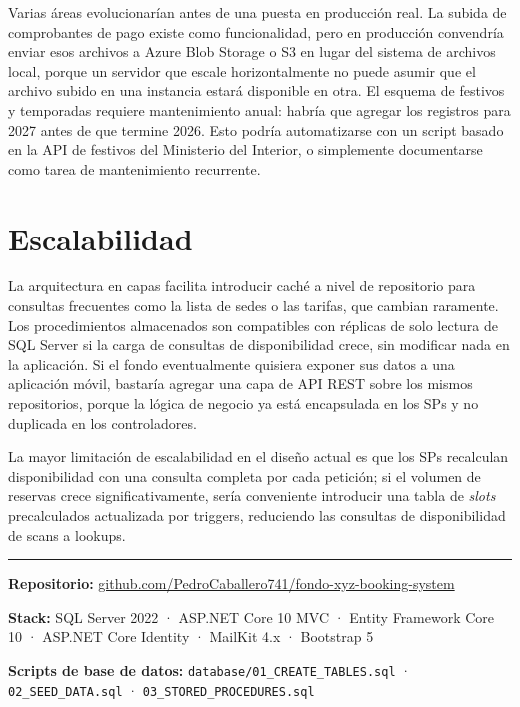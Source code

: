 \documentclass[12pt, letterpaper]{article}
\begin{document}
Varias áreas evolucionarían antes de una puesta en producción real. La subida de comprobantes de pago existe como funcionalidad, pero en producción convendría enviar esos archivos a Azure Blob Storage o S3 en lugar del sistema de archivos local, porque un servidor que escale horizontalmente no puede asumir que el archivo subido en una instancia estará disponible en otra. El esquema de festivos y temporadas requiere mantenimiento anual: habría que agregar los registros para 2027 antes de que termine 2026. Esto podría automatizarse con un script basado en la API de festivos del Ministerio del Interior, o simplemente documentarse como tarea de mantenimiento recurrente.

\section{Escalabilidad}

La arquitectura en capas facilita introducir caché a nivel de repositorio para consultas frecuentes como la lista de sedes o las tarifas, que cambian raramente. Los procedimientos almacenados son compatibles con réplicas de solo lectura de SQL Server si la carga de consultas de disponibilidad crece, sin modificar nada en la aplicación. Si el fondo eventualmente quisiera exponer sus datos a una aplicación móvil, bastaría agregar una capa de API REST sobre los mismos repositorios, porque la lógica de negocio ya está encapsulada en los SPs y no duplicada en los controladores.

La mayor limitación de escalabilidad en el diseño actual es que los SPs recalculan disponibilidad con una consulta completa por cada petición; si el volumen de reservas crece significativamente, sería conveniente introducir una tabla de \emph{slots} precalculados actualizada por triggers, reduciendo las consultas de disponibilidad de scans a lookups.

\vspace{2em}
\hrule
\vspace{1em}

\noindent\textbf{Repositorio:} \href{https://github.com/PedroCaballero741/fondo-xyz-booking-system}{github.com/PedroCaballero741/fondo-xyz-booking-system}

\noindent\textbf{Stack:} SQL Server 2022 · ASP.NET Core 10 MVC · Entity Framework Core 10 · ASP.NET Core Identity · MailKit 4.x · Bootstrap 5

\noindent\textbf{Scripts de base de datos:} \texttt{database/01\_CREATE\_TABLES.sql} · \texttt{02\_SEED\_DATA.sql} · \texttt{03\_STORED\_PROCEDURES.sql}
\end{document}

